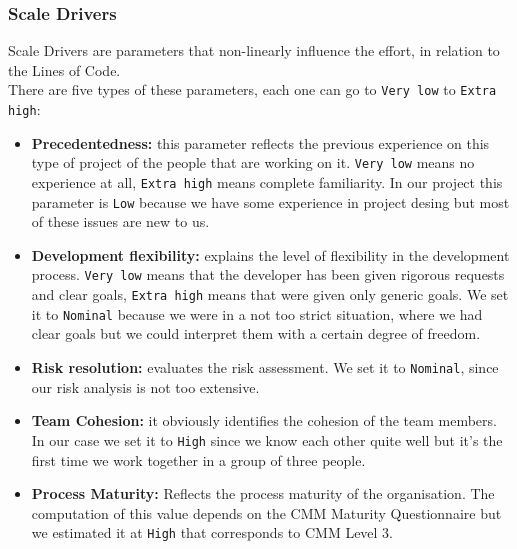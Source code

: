 \newpage
\subsubsection{Scale Drivers}
Scale Drivers are parameters that non-linearly influence the effort, in relation to the Lines of Code.\\
There are five types of these parameters, each one can go to \texttt{Very low} to \texttt{Extra high}:\\
\begin{itemize}
\item{\textbf{Precedentedness:}} this parameter reflects the previous experience on this type of project of the people that are working on it. \texttt{Very low} means no experience at all, \texttt{Extra high} means complete familiarity.
	In our project this parameter is \texttt{Low} because we have some experience in project desing but most of these issues are new to us.\\
\item{\textbf{Development flexibility:}} explains the level of flexibility in the development process. \texttt{Very low} means that the developer has been given rigorous requests and clear goals, \texttt{Extra high} means that were given only generic goals.
	We set it to \texttt{Nominal} because we were in a not too strict situation, where we had clear goals but we could interpret them with a certain degree of freedom.\\
\item{\textbf{Risk resolution:}} evaluates the risk assessment. We set it to \texttt{Nominal}, since our risk analysis is not too extensive.
\item{\textbf{Team Cohesion:}} it obviously identifies the cohesion of the team members. In our case we set it to \texttt{High} since we know each other quite well but it's the first time we work together in a group of three people.\\
\item{\textbf{Process Maturity:}} Reflects the process maturity of the organisation. The computation of this value depends on the CMM Maturity Questionnaire but we estimated it at \texttt{High} that corresponds to CMM Level 3.\\
\end{itemize}




